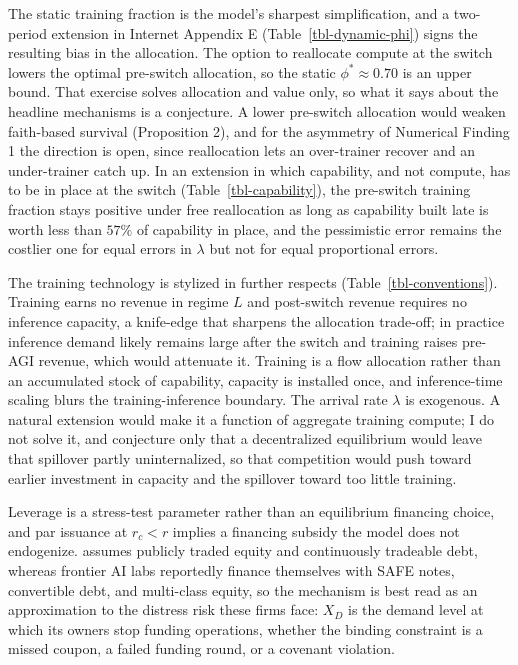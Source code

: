 \documentclass[
  11pt,
  letterpaper,
]{scrartcl}
\begin{document}
The static training fraction is the model's sharpest simplification, and
a two-period extension in Internet Appendix E
(Table~\ref{tbl-dynamic-phi}) signs the resulting bias in the
allocation. The option to reallocate compute at the switch lowers the
optimal pre-switch allocation, so the static \(\phi^* \approx 0.70\) is
an upper bound. That exercise solves allocation and value only, so what
it says about the headline mechanisms is a conjecture. A lower
pre-switch allocation would weaken faith-based survival (Proposition 2),
and for the asymmetry of Numerical Finding 1 the direction is open,
since reallocation lets an over-trainer recover and an under-trainer
catch up. In an extension in which capability, and not compute, has to
be in place at the switch (Table~\ref{tbl-capability}), the pre-switch
training fraction stays positive under free reallocation as long as
capability built late is worth less than \(57\%\) of capability in
place, and the pessimistic error remains the costlier one for equal
errors in \(\lambda\) but not for equal proportional errors.

The training technology is stylized in further respects
(Table~\ref{tbl-conventions}). Training earns no revenue in regime \(L\)
and post-switch revenue requires no inference capacity, a knife-edge
that sharpens the allocation trade-off; in practice inference demand
likely remains large after the switch and training raises pre-AGI
revenue, which would attenuate it. Training is a flow allocation rather
than an accumulated stock of capability, capacity is installed once, and
inference-time scaling blurs the training-inference boundary. The
arrival rate \(\lambda\) is exogenous. A natural extension would make it
a function of aggregate training compute; I do not solve it, and
conjecture only that a decentralized equilibrium would leave that
spillover partly uninternalized, so that competition would push toward
earlier investment in capacity and the spillover toward too little
training.

Leverage is a stress-test parameter rather than an equilibrium financing
choice, and par issuance at \(r_c < r\) implies a financing subsidy the
model does not endogenize. \citet{leland1994corporate} assumes publicly
traded equity and continuously tradeable debt, whereas frontier AI labs
reportedly finance themselves with SAFE notes, convertible debt, and
multi-class equity, so the mechanism is best read as an approximation to
the distress risk these firms face: \(X_D\) is the demand level at which
its owners stop funding operations, whether the binding constraint is a
missed coupon, a failed funding round, or a covenant violation.
\end{document}
